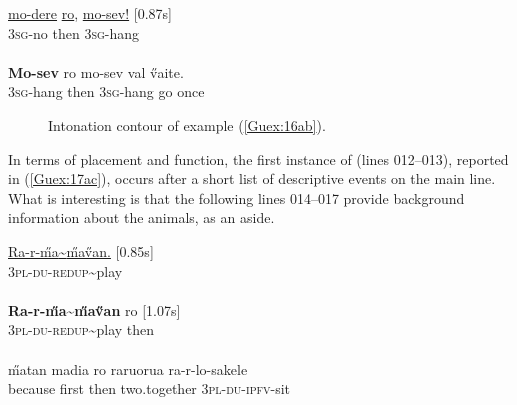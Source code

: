 \documentclass[output=paper]{LSP/langsci}
\begin{document}
\begin{exe}
\ex \label{Guex:16ab}
\begin{xlist}
\ex \label{Guex:16a}
\gll \underline{mo-dere}          \underline{ro},                 \underline{mo-sev!}     [0.87s]\\
\textsc{3sg}-no     then  \textsc{3sg}-hang \\
\glt {}\\
\ex \label{Guex:16b}
\gll  \textbf{Mo-sev}       ro mo-sev         val   \H{v}aite.\\     	       
 \textsc{3sg}-hang   then   \textsc{3sg}-hang     go    once\\
\glt {} 
\end{xlist}
\end{exe}

\begin{figure}[ht]
\caption{Intonation contour of example (\ref{Guex:16ab}). \label{GuF6}}
\end{figure}


In terms of placement and function, the first instance of  (lines 012--013), reported in (\ref{Guex:17ac}), occurs after a short list of descriptive events on the main line. What is interesting is that the following lines 014--017 provide background information about the animals, as an aside. 

\begin{exe}
\ex \label{Guex:17ac}
\begin{xlist}
\ex \label{Guex:17a}
\gll \underline{Ra-r-\H{m}a{\textasciitilde}\H{m}a\H{v}an.}           [0.85s]\\
\textsc{3pl-du-redup}{\textasciitilde}play \\
\glt {}\\
\ex \label{Guex:17b}
\gll \textbf{Ra-r-\H{m}a{\textasciitilde}\H{m}a\H{v}an}              ro [1.07s]\\
\textsc{3pl-du-redup}{\textasciitilde}play   then\\
\glt {}\\
\ex \label{Guex:17c}
\gll   \H{m}atan     madia ro raruorua ra-r-lo-sakele\\     	       
 because   first then two.together \textsc{3pl-du-ipfv}-sit\\
\glt {} 
\end{xlist}
\end{exe}
\end{document}
